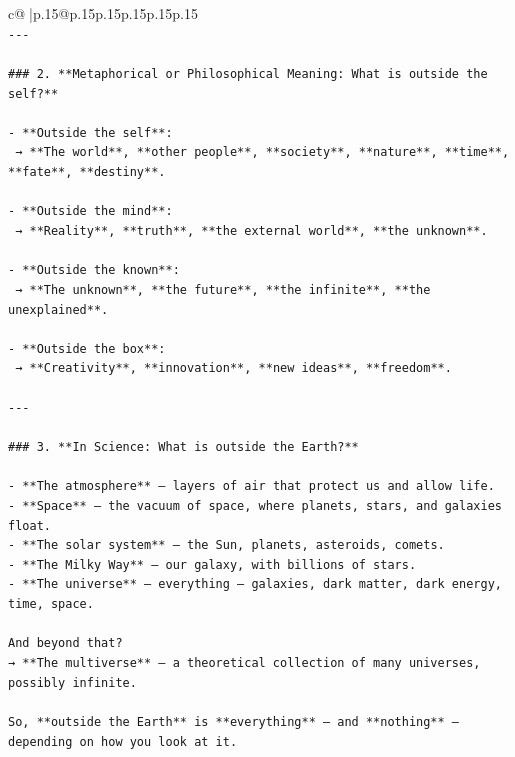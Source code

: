 \documentclass{article}
\begin{document}
{\begin{supertabular}{c@{$\;$}|p{.15\linewidth}@{}p{.15\linewidth}p{.15\linewidth}p{.15\linewidth}p{.15\linewidth}p{.15\linewidth}}
{{{\\ 
\texttt{{-}{-}{-}} \\
\\ 
\texttt{\#\#\# 2. **Metaphorical or Philosophical Meaning: What is outside the self?**} \\
\\ 
\texttt{{-} **Outside the self**:  } \\
\texttt{  → **The world**, **other people**, **society**, **nature**, **time**, **fate**, **destiny**.} \\
\\ 
\texttt{{-} **Outside the mind**:  } \\
\texttt{  → **Reality**, **truth**, **the external world**, **the unknown**.} \\
\\ 
\texttt{{-} **Outside the known**:  } \\
\texttt{  → **The unknown**, **the future**, **the infinite**, **the unexplained**.} \\
\\ 
\texttt{{-} **Outside the box**:  } \\
\texttt{  → **Creativity**, **innovation**, **new ideas**, **freedom**.} \\
\\ 
\texttt{{-}{-}{-}} \\
\\ 
\texttt{\#\#\# 3. **In Science: What is outside the Earth?**} \\
\\ 
\texttt{{-} **The atmosphere** — layers of air that protect us and allow life.} \\
\texttt{{-} **Space** — the vacuum of space, where planets, stars, and galaxies float.} \\
\texttt{{-} **The solar system** — the Sun, planets, asteroids, comets.} \\
\texttt{{-} **The Milky Way** — our galaxy, with billions of stars.} \\
\texttt{{-} **The universe** — everything — galaxies, dark matter, dark energy, time, space.} \\
\\ 
\texttt{And beyond that?  } \\
\texttt{→ **The multiverse** — a theoretical collection of many universes, possibly infinite.} \\
\\ 
\texttt{So, **outside the Earth** is **everything** — and **nothing** — depending on how you look at it.} \\
}}}
\end{supertabular}}
\end{document}
